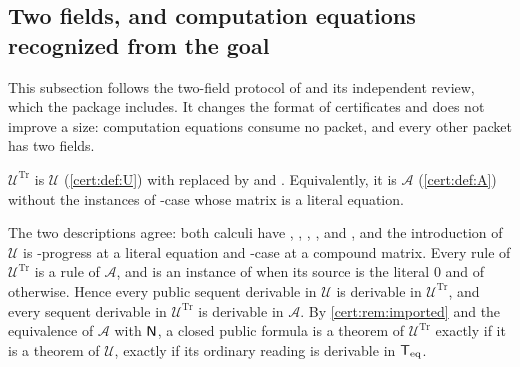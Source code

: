\subsection{Two fields, and computation equations recognized from the goal}\label{cert:sec:two-field}

This subsection follows the two-field protocol of  and its
independent review, which the package includes. It changes the format of
certificates and does not improve a size: computation equations consume no
packet, and every other packet has two fields.

\begin{definition}\label{cert:def:Utr}
$\mathcal U^{\mathrm{Tr}}$ is $\mathcal U$ (\cref{cert:def:U}) with
 replaced by  and . Equivalently, it is
$\mathcal A$ (\cref{cert:def:A}) without the instances of -case
whose matrix is a literal equation.
\end{definition}

The two descriptions agree: both calculi have , ,
, ,  and , and the
introduction of $\mathcal U$ is -progress at a literal equation
and -case at a compound matrix. Every rule of
$\mathcal U^{\mathrm{Tr}}$ is a rule of $\mathcal A$, and  is an
instance of  when its source is the literal $0$ and of
 otherwise. Hence every public sequent derivable in $\mathcal U$
is derivable in $\mathcal U^{\mathrm{Tr}}$, and every sequent derivable in
$\mathcal U^{\mathrm{Tr}}$ is derivable in $\mathcal A$. By
\cref{cert:rem:imported} and the equivalence of $\mathcal A$ with $\mathsf{N}$, a
closed public formula is a theorem of $\mathcal U^{\mathrm{Tr}}$ exactly if
it is a theorem of $\mathcal U$, exactly if its ordinary reading is derivable
in $\mathsf{T}_{\mathrm{eq}}$.

